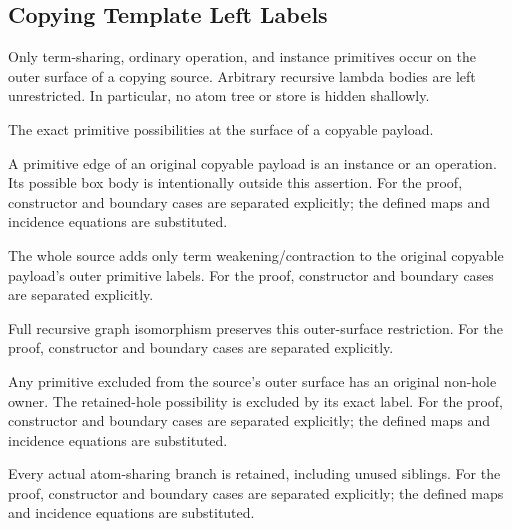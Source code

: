 \subsection{Copying Template Left Labels}
Only term-sharing, ordinary operation, and instance primitives occur on the outer surface of a copying source. Arbitrary recursive lambda bodies are left unrestricted. In particular, no atom tree or store is hidden shallowly.

The exact primitive possibilities at the surface of a copyable payload.
\par{}

A primitive edge of an original copyable payload is an instance or an operation. Its possible box body is intentionally outside this assertion.
For the proof, constructor and boundary cases are separated explicitly; the defined maps and incidence equations are substituted.
\par{}

The whole source adds only term weakening/contraction to the original copyable payload's outer primitive labels.
For the proof, constructor and boundary cases are separated explicitly.
\par{}

Full recursive graph isomorphism preserves this outer-surface restriction.
For the proof, constructor and boundary cases are separated explicitly.
\par{}

Any primitive excluded from the source's outer surface has an original non-hole owner. The retained-hole possibility is excluded by its exact label.
For the proof, constructor and boundary cases are separated explicitly; the defined maps and incidence equations are substituted.
\par{}

Every actual atom-sharing branch is retained, including unused siblings.
For the proof, constructor and boundary cases are separated explicitly; the defined maps and incidence equations are substituted.
\par{}

